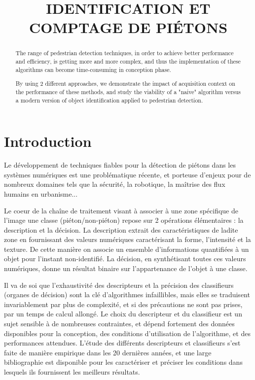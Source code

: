 \documentclass{article}
\title{IDENTIFICATION ET COMPTAGE DE PI\'{E}TONS}
\begin{document}
%
\maketitle
%
\begin{abstract}
	
	The range of pedestrian detection techniques, in order to achieve better performance and efficiency, is getting more and more complex, and thus the implementation of these algorithms can become time-consuming in conception phase.
	
	By using 2 different approaches, we demonstrate the impact of acquisition context on the performance of these methods, and study the viability of a "naive" algorithm versus a modern version of object identification applied to pedestrian detection.
\end{abstract}
%

%
\section{Introduction}
\label{sec:intro}
	Le développement de techniques fiables pour la détection de piétons dans les systèmes numériques est une problématique récente, et porteuse d'enjeux pour de nombreux domaines tels que la sécurité, la robotique, la maîtrise des flux humains en urbanisme... 

	Le coeur de la chaîne de traitement visant à associer à une zone spécifique de l'image une classe (piéton/non-piéton) repose sur 2 opérations élémentaires : la description et la décision. La description extrait des caractéristiques de ladite zone en fournissant des valeurs numériques caractérisant la forme, l'intensité et la texture. De cette manière on associe un ensemble d'informations quantifiées à un objet pour l'instant non-identifié. La décision, en synthétisant toutes ces valeurs numériques, donne un résultat binaire sur l'appartenance de l'objet à une classe.

	Il va de soi que l'exhaustivité des descripteurs et la précision des classifieurs (organes de décision) sont la clé d'algorithmes infaillibles, mais elles se traduisent invariablement par plus de complexité, et si des précautions ne sont pas prises, par un temps de calcul allongé. Le choix du descripteur et du classifieur est un sujet sensible à de nombreuses contraintes, et dépend fortement des données disponibles pour la conception, des conditions d'utilisation de l'algorithme, et des performances attendues. L'étude des différents descripteurs et classifieurs s'est faite de manière empirique dans les 20 dernières années, et une large bibliographie est disponible pour les caractériser et préciser les conditions dans lesquels ils fournissent les meilleurs résultats.
\end{document}
